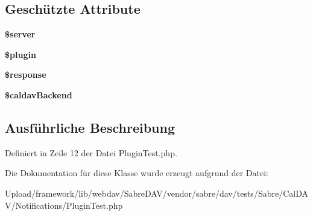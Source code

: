 \subsection*{Geschützte Attribute}
\begin{DoxyCompactItemize}
\item 
\mbox{\label{class_sabre_1_1_cal_d_a_v_1_1_notifications_1_1_plugin_test_a82fac70339bb9024ee6dbe3890302a35}} 
{\bfseries \$server}
\item 
\mbox{\label{class_sabre_1_1_cal_d_a_v_1_1_notifications_1_1_plugin_test_a2711950c69de1f6421e0cc73842fa1d0}} 
{\bfseries \$plugin}
\item 
\mbox{\label{class_sabre_1_1_cal_d_a_v_1_1_notifications_1_1_plugin_test_a1cfc9171cc809c3694b781a85c27794b}} 
{\bfseries \$response}
\item 
\mbox{\label{class_sabre_1_1_cal_d_a_v_1_1_notifications_1_1_plugin_test_a20ac7f577e77c09485b71f7bfbbbbb06}} 
{\bfseries \$caldav\+Backend}
\end{DoxyCompactItemize}


\subsection{Ausführliche Beschreibung}


Definiert in Zeile 12 der Datei Plugin\+Test.\+php.



Die Dokumentation für diese Klasse wurde erzeugt aufgrund der Datei\+:\begin{DoxyCompactItemize}
\item 
Upload/framework/lib/webdav/\+Sabre\+D\+A\+V/vendor/sabre/dav/tests/\+Sabre/\+Cal\+D\+A\+V/\+Notifications/Plugin\+Test.\+php\end{DoxyCompactItemize}
